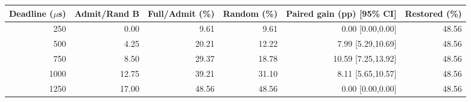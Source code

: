 \begin{tabular}{rrrrrr}
\hline
Deadline ($\mu$s) & Admit/Rand B & Full/Admit (\%) & Random (\%) & Paired gain (pp) [95\% CI] & Restored (\%) \\
\hline
250 & 0.00 & 9.61 & 9.61 & 0.00 [0.00,0.00] & 48.56 \\
500 & 4.25 & 20.21 & 12.22 & 7.99 [5.29,10.69] & 48.56 \\
750 & 8.50 & 29.37 & 18.78 & 10.59 [7.25,13.92] & 48.56 \\
1000 & 12.75 & 39.21 & 31.10 & 8.11 [5.65,10.57] & 48.56 \\
1250 & 17.00 & 48.56 & 48.56 & 0.00 [0.00,0.00] & 48.56 \\
\hline
\end{tabular}
